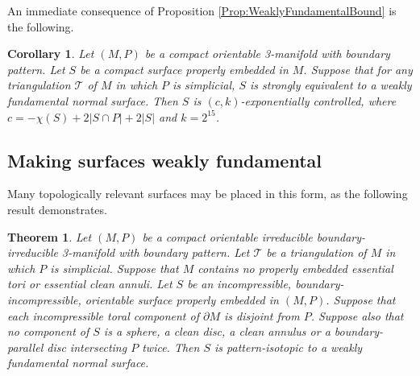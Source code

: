 \documentclass[oneside]{amsart}
\numberwithin{equation}{section}
\theoremstyle{plain}
\newtheorem{theorem}[equation]{Theorem}
\newtheorem{corollary}[equation]{Corollary}
\theoremstyle{definition}
\begin{document}
An immediate consequence of Proposition \ref{Prop:WeaklyFundamentalBound} is the following.

\begin{corollary}
\label{Cor:WeaklyFundExpControlled}
Let $(M,P)$ be a compact orientable 3-manifold with boundary pattern. Let $S$ be a compact surface properly embedded in $M$.
Suppose that for any triangulation $\mathcal{T}$ of $M$ in which $P$ is simplicial, $S$ is strongly equivalent to a weakly fundamental
normal surface. Then $S$ is $(c,k)$-exponentially controlled, where $c = -\chi(S) + 2 |S \cap P| + 2|S|$ and $k = 2^{15}$.
\end{corollary}

\subsection{Making surfaces weakly fundamental}
Many topologically relevant surfaces may be placed in this form, as the following result demonstrates.

\begin{theorem}
\label{Thm:MakeWeaklyFundamental}
Let $(M,P)$ be a compact orientable irreducible boundary-irreducible 3-manifold with boundary pattern. Let $\mathcal{T}$ be a triangulation of $M$
in which $P$ is simplicial. Suppose that $M$ contains no properly
embedded essential tori or essential clean annuli.  
Let $S$ be an incompressible, boundary-incompressible, orientable surface properly embedded in $(M,P)$.
Suppose that each incompressible toral component of $\partial M$ is disjoint from $P$.
Suppose also that no component of $S$ is a sphere, a clean disc, a clean annulus or a boundary-parallel disc intersecting $P$ twice.
Then $S$ is pattern-isotopic to a weakly fundamental normal surface.
\end{theorem}
\end{document}
